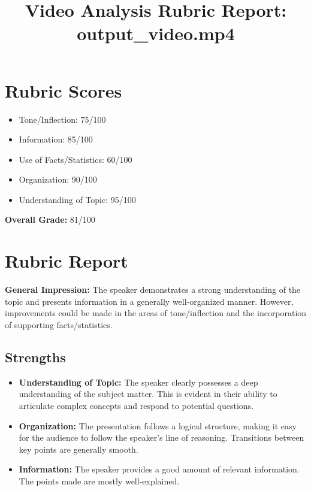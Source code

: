 \documentclass{article}
\title{Video Analysis Rubric Report: output\_video.mp4}
\date{}
\begin{document}
\maketitle

\section*{Rubric Scores}

\begin{itemize}
    \item Tone/Inflection: 75/100
    \item Information: 85/100
    \item Use of Facts/Statistics: 60/100
    \item Organization: 90/100
    \item Understanding of Topic: 95/100
\end{itemize}

\noindent\textbf{Overall Grade:} 81/100

\section*{Rubric Report}

\noindent\textbf{General Impression:} The speaker demonstrates a strong understanding of the topic and presents information in a generally well-organized manner. However, improvements could be made in the areas of tone/inflection and the incorporation of supporting facts/statistics.

\subsection*{Strengths}

\begin{itemize}
    \item \textbf{Understanding of Topic:} The speaker clearly possesses a deep understanding of the subject matter. This is evident in their ability to articulate complex concepts and respond to potential questions.
    \item \textbf{Organization:} The presentation follows a logical structure, making it easy for the audience to follow the speaker's line of reasoning. Transitions between key points are generally smooth.
    \item \textbf{Information:} The speaker provides a good amount of relevant information. The points made are mostly well-explained.
\end{itemize}
\end{document}
